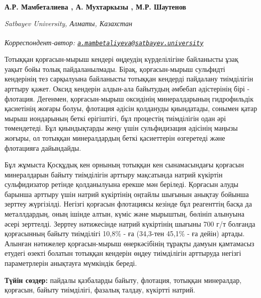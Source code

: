 
\begin{articleheader}

{\bfseries
А.Р. Мамбеталиева\textsuperscript{\envelope } \authorid,
А. Мухтаркызы \authorid,
М.Р. Шаутенов} \authorid
\end{articleheader}

\begin{affiliation}
\emph{Satbayev University, Алматы, Казахстан}

\raggedright \textsuperscript{\envelope }{\em Корреспондент-автор: \href{mailto:a.mambetaliyeva@satbayev.university}{\nolinkurl{a.mambetaliyeva@satbayev.university}}}
\end{affiliation}

Тотыққан қорғасын-мырыш кендері өңдеудің күрделілігіне байланысты ұзақ
уақыт бойы толық пайдаланылмады. Бірақ, қорғасын-мырыш сульфидті
кендерінің тез сарқылуына байланысты тотыққан кендерді пайдалану
тиімділігін арттыру қажет. Оксид кендерін алдын-ала байытудың әмбебап
әдістерінің бірі - флотация. Дегенмен, қорғасын-мырыш оксидінің
минералдарының гидрофильдік қасиетінің жоғары болуы, флотация әдісін
қолдануды қиындатады, сонымен қатар мырыш иондарының беткі ерігіштігі,
бұл процестің тиімділігін одан әрі төмендетеді. Бұл қиындықтарды жеңу
үшін сульфидизация әдісінің маңызы жоғыры, ол тотыққан минералдардың
беткі қасиеттерін өзгеретеді және флотацияға дайындайды.

Бұл жұмыста Қосқұдық кен орнының тотыққан кен сынамасындағы қорғасын
минералдарын байыту тиімділігін арттыру мақсатында натрий күкіртін
сульфидизатор ретінде қолданылуына ерекше мән беріледі. Қорғасын алуды
барынша арттыру үшін натрий күкіртінің оңтайлы шығынын анықтау бойынша
зерттеу жүргізілді. Негізгі қорғасын флотациясы кезінде бұл реагенттің
басқа да металлдардың, оның ішінде алтын, күміс және мырыштың, бөлініп
алынуына әсері зерттелді. Зерртеу нәтижесінде натрий күкіртінің шығыны
700 г/т болғанда қорғасынның байыту тиімділігі 10,8\% - ға (34,3-тен
45,1\% - ға дейін) артады. Алынған нәтижелер қорғасын-мырыш
өнеркәсібінің тұрақты дамуын қамтамасыз етудегі өзекті болатын тотыққан
кендерін өңдеу тиімділігін арттыруда негізгі параметрлерін анықтауға
мүмкіндік береді.

{\bfseries Түйін сөздер:} пайдалы қазбаларды байыту, флотация, тотыққан
минералдар, қорғасын, байыту тиімділігі, фазалық талдау, күкіртті
натрий.

